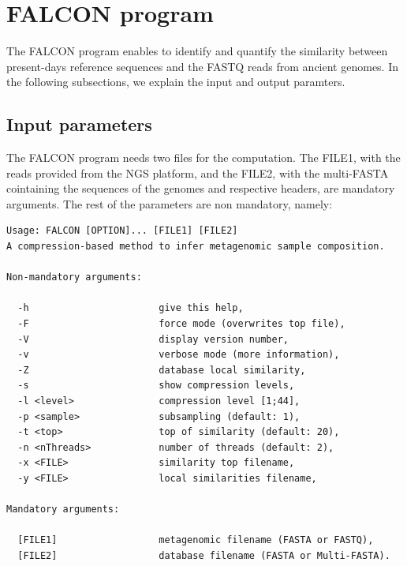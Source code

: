 \documentclass[11pt,journal,compsoc]{report}[1]
\begin{document}
\section*{FALCON program}

The FALCON program enables to identify and quantify the similarity between
present-days reference sequences and the FASTQ reads from ancient genomes.
In the following subsections, we explain the input and output paramters.

\subsection*{Input parameters}

The FALCON program needs two files for the computation. The FILE1,
with the reads provided from the NGS platform, and the FILE2,
with the multi-FASTA cointaining the sequences of the genomes and
respective headers, are mandatory arguments. The rest of the parameters
are non mandatory, namely:
\begin{lstlisting}
Usage: FALCON [OPTION]... [FILE1] [FILE2]                                
A compression-based method to infer metagenomic sample composition.      
                                                                         
Non-mandatory arguments:                                                 
                                                                         
  -h                       give this help,                               
  -F                       force mode (overwrites top file),             
  -V                       display version number,                       
  -v                       verbose mode (more information),              
  -Z                       database local similarity,                    
  -s                       show compression levels,                      
  -l <level>               compression level [1;44],                    
  -p <sample>              subsampling (default: 1),                    
  -t <top>                 top of similarity (default: 20),              
  -n <nThreads>            number of threads (default: 2),              
  -x <FILE>                similarity top filename,                      
  -y <FILE>                local similarities filename,                  
                                                                         
Mandatory arguments:                                                     
                                                                         
  [FILE1]                  metagenomic filename (FASTA or FASTQ),        
  [FILE2]                  database filename (FASTA or Multi-FASTA).
\end{lstlisting}
\end{document}
